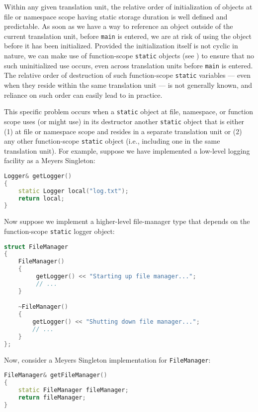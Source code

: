 Within any given translation unit, the relative order of initialization
of objects at file or namespace scope having static storage duration is
well defined and predictable. As soon as we have a way to reference an
object outside of the current translation unit, before \lstinline!main! is
entered, we are at risk of using the object before it has been
initialized. Provided the initialization itself is not cyclic in nature,
we can make use of function-scope \lstinline!static! objects (see ) to
ensure that no such uninitialized use occurs, even across translation
units before \lstinline!main! is entered. The relative order of destruction
of such function-scope \lstinline!static! variables --- even when they
reside within the same translation unit --- is not generally known, and
reliance on such order can easily lead to  in
practice.

This specific problem occurs when a \lstinline!static! object at file,
namespace, or function scope uses (or might use) in its destructor
another \lstinline!static! object that is either (1) at file or namespace
scope and resides in a separate translation unit or (2) any other
function-scope \lstinline!static! object (i.e., including one in the same
translation unit). For example, suppose we have implemented a low-level
logging facility as a Meyers Singleton:

\begin{lstlisting}[language=C++]
Logger& getLogger()
{
    static Logger local("log.txt");
    return local;
}
\end{lstlisting}
    
\noindent Now suppose we implement a higher-level file-manager type that depends
on the function-scope \lstinline!static! logger object:

\begin{lstlisting}[language=C++]
struct FileManager
{
    FileManager()
    {
         getLogger() << "Starting up file manager...";
         // ...
    }

    ~FileManager()
    {
        getLogger() << "Shutting down file manager...";
        // ...
    }
};
\end{lstlisting}
    
\noindent Now, consider a Meyers Singleton implementation for
\lstinline!FileManager!:

\begin{lstlisting}[language=C++]
FileManager& getFileManager()
{
    static FileManager fileManager;
    return fileManager;
}
\end{lstlisting}
    
